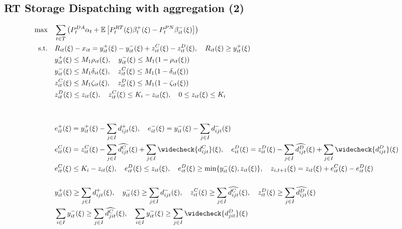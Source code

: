 \documentclass[10pt]{article}
\begin{document}
\subsection{RT Storage Dispatching with aggregation (2)}
\begin{align*}
    \text{max} \quad &\sum_{t\in T}\left(P_t^{DA} \alpha_{t} + \mathbb{E}\left[P_t^{RT}(\xi)\beta_{t}^{+}(\xi) - P_t^{PN}\beta_{it}^{-}(\xi)\right]\right)&\\    
    \text{s.t.} \quad &R_{it}(\xi) - x_{it} = y_{it}^{+}(\xi) - y_{it}^{-}(\xi) + z^C_{it}(\xi) - z^D_{it}(\xi), \quad R_{it}(\xi) \geq y^+_{it}(\xi)&\\
    &y^+_{it}(\xi) \leq M_1 \rho_{it}(\xi), \quad y^-_{it}(\xi) \leq M_1 (1 - \rho_{it}(\xi)) &\\
    &y^-_{it}(\xi) \leq M_1 \delta_{it}(\xi), \quad z^C_{it}(\xi) \leq M_1 (1 - \delta_{it}(\xi)) &\\
    &z^C_{it}(\xi) \leq M_1 \zeta_{it}(\xi), \quad z^D_{it}(\xi) \leq M_1 (1 - \zeta_{it}(\xi)) &\\
    &z^D_{it}(\xi) \le z_{it}(\xi), \quad z^C_{it}(\xi) \le K_i-z_{it}(\xi), \quad 0 \leq z_{it}(\xi) \leq K_i &\\
    &&\\ 
    &&\\
    &e^+_{it}(\xi) = y^+_{it}(\xi) - \sum_{j \in I}d^{+}_{ijt}(\xi), \quad e^-_{it}(\xi) = y^-_{it}(\xi) - \sum_{j \in I}d^{-}_{ijt}(\xi) &\\
    &e^C_{it}(\xi) = z^C_{it}(\xi) - \sum_{j \in I}\widehat{d^{C}_{ijt}}(\xi) + \sum_{j \in I}\widecheck{d^{C}_{ijt}}(\xi), \quad e^D_{it}(\xi) = z^D_{it}(\xi) - \sum_{j \in I}\widehat{d^{D}_{ijt}}(\xi) + \sum_{j \in I}\widecheck{d^{D}_{ijt}}(\xi) &\\
    &e^C_{it}(\xi) \leq K_i - z_{it}(\xi), \quad e^D_{it}(\xi) \leq z_{it}(\xi), \quad e^D_{it}(\xi) \geq \text{min} \{y^-_{it}(\xi), z_{it}(\xi) \}, \quad z_{i,t+1}(\xi) = z_{it}(\xi) + e^C_{it}(\xi) - e^D_{it}(\xi) &\\
    &&\\
    &y^+_{it}(\xi) \geq \sum_{j \in I}d^+_{ijt}(\xi), \quad y^-_{it}(\xi) \geq \sum_{j \in I}d^{-}_{ijt}(\xi), \quad z^C_{it}(\xi) \geq \sum_{j \in I}\widehat{d^{C}_{ijt}}(\xi), \quad z^D_{it}(\xi) \geq \sum_{j \in I}\widehat{d^{D}_{ijt}}(\xi)&\\
    &\sum_{i \in I}y^-_{it}(\xi) \geq \sum_{j \in I}\widehat{d^{C}_{jit}}(\xi), \quad \sum_{i \in I}y^-_{it}(\xi) \geq \sum_{j \in I}\widecheck{d^{D}_{jit}}(\xi)&\\

\end{align*}
\end{document}
